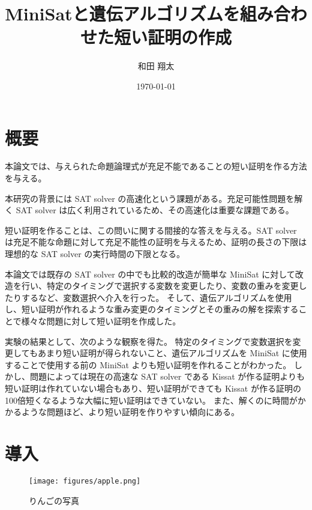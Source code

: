 \documentclass[titlepage]{jsarticle}
\title{MiniSatと遺伝アルゴリズムを組み合わせた短い証明の作成}
\author{和田 翔太}
\date{\today}
\begin{document}
\maketitle










\section{概要}





本論文では、与えられた命題論理式が充足不能であることの短い証明を作る方法を与える。

本研究の背景には SAT solver の高速化という課題がある。充足可能性問題を解く SAT solver は広く利用されているため、その高速化は重要な課題である。

短い証明を作ることは、この問いに関する間接的な答えを与える。SAT solver は充足不能な命題に対して充足不能性の証明を与えるため、証明の長さの下限は理想的な SAT solver の実行時間の下限となる。 

本論文では既存の SAT solver の中でも比較的改造が簡単な MiniSat に対して改造を行い、特定のタイミングで選択する変数を変更したり、変数の重みを変更したりするなど、変数選択へ介入を行った。
そして、遺伝アルゴリズムを使用し、短い証明が作れるような重み変更のタイミングとその重みの解を探索することで様々な問題に対して短い証明を作成した。

実験の結果として、次のような観察を得た。
特定のタイミングで変数選択を変更してもあまり短い証明が得られないこと、遺伝アルゴリズムを MiniSat に使用することで使用する前の MiniSat よりも短い証明を作れることがわかった。
しかし、問題によっては現在の高速な SAT solver である Kissat が作る証明よりも短い証明は作れていない場合もあり、短い証明ができても Kissat が作る証明の100倍短くなるような大幅に短い証明はできていない。
また、解くのに時間がかかるような問題ほど、より短い証明を作りやすい傾向にある。










\section{導入}

\begin{figure}[t]
 	\texttt{[image: figures/apple.png]}
	\caption{りんごの写真}
\end{figure}
\end{document}
